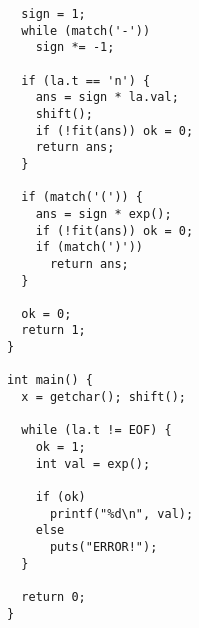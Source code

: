 \begin{verbatim}
  sign = 1;
  while (match('-'))
    sign *= -1;

  if (la.t == 'n') {
    ans = sign * la.val;
    shift();
    if (!fit(ans)) ok = 0;
    return ans;
  }

  if (match('(')) {
    ans = sign * exp();
    if (!fit(ans)) ok = 0;
    if (match(')'))
      return ans;
  }

  ok = 0;
  return 1;
}

int main() {
  x = getchar(); shift();

  while (la.t != EOF) {
    ok = 1;
    int val = exp();
  
    if (ok)
      printf("%d\n", val);
    else
      puts("ERROR!");
  }
  
  return 0;
}
\end{verbatim}
